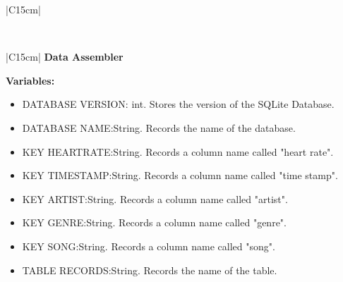 \documentclass[letterpaper,english, 12pt]{scrreprt}
\begin{document}
\begin{center}
\begin{tabular}{|C{15cm}|}
\begin{itemize}
                               \end{itemize}\\
                        \hline
        \end{tabular}
\end{center}

\begin{center}
        \begin{tabular}{|C{15cm}|}
                \hline
                        \textbf{Data Assembler} \\
                \hline
                        \begin{flushleft}
                                \textbf{Variables:} \\
                        \end{flushleft}
                                \begin{itemize}
					\item DATABASE VERSION: int. Stores the version of the SQLite Database.
                                        \item DATABASE NAME:String. Records the name of the database.
                                        \item KEY HEARTRATE:String. Records a column name called "heart rate".
                                        \item KEY TIMESTAMP:String. Records a column name called "time stamp".
                                        \item KEY ARTIST:String. Records a column name called "artist".
                                        \item KEY GENRE:String. Records a column name called "genre".
                                        \item KEY SONG:String. Records a column name called "song".
                                        \item TABLE RECORDS:String. Records the name of the table.



\end{itemize}
\end{tabular}
\end{center}
\end{document}
